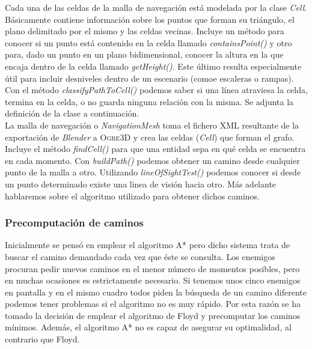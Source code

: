 
Cada una de las celdas de la malla de navegación está modelada por la
clase \textit{Cell}. Básicamente contiene información sobre los puntos
que forman su triángulo, el plano delimitado por el mismo y las celdas vecinas.
Incluye un método para conocer si un punto está contenido en la celda llamado
\textit{containsPoint()} y otro para, dado un punto en un plano bidimensional,
conocer la altura en la que encaja dentro de la celda llamado \textit{getHeight()}.
Este último resulta especialmente útil para incluir desniveles dentro de un
escenario (comoe escaleras o rampas). Con el método \textit{classifyPathToCell()}
podemos saber si una línea atraviesa la celda, termina en la celda, o no
guarda ninguna relación con la misma. Se adjunta la definición de la clase
a continuación.\\



La malla de navegación o \textit{NavigationMesh} toma el fichero XML
resultante de la exportación de \textit{Blender} a \textsc{Ogre3D} y
crea las celdas (\textit{Cell}) que forman el grafo. Incluye el método
\textit{findCell()} para que una entidad sepa en qué celda se encuentra
en cada momento. Con \textit{buildPath()} podemos obtener un camino desde
cualquier punto de la malla a otro. Utilizando \textit{lineOfSightTest()}
podemos conocer si desde un punto determinado existe una linea de visión
hacia otro. Más adelante hablaremos sobre el algoritmo utilizado para
obtener dichos caminos.\\



\subsubsection{Precomputación de caminos}

Inicialmente se pensó en emplear el algoritmo A* \cite{mill09} pero dicho
sistema trata de buscar el camino demandado cada vez que éste se consulta.
Los enemigos procuran pedir nuevos caminos en el menor número de momentos
posibles, pero en muchas ocasiones es estrictamente necesario. Si tenemos
unos cinco enemigos en pantalla y en el mismo cuadro todos piden la búsqueda
de un camino diferente podemos tener problemas si el algoritmo no es muy rápido.
Por esta razón se ha tomado la decisión de emplear el algoritmo de Floyd
y precomputar los caminos mínimos. Además, el algoritmo A* no es capaz
de asegurar su optimalidad, al contrario que Floyd.\\

